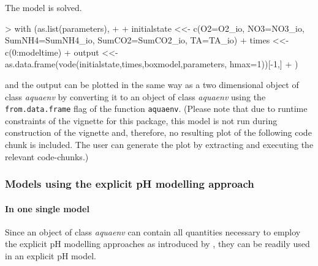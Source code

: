 \documentclass[article,nojss]{jss}
\begin{document}
The model is solved. 

\begin{scriptsize}
\begin{Schunk}
\begin{Sinput}
> with (as.list(parameters),
+       {
+         initialstate <<- c(O2=O2_io, NO3=NO3_io, SumNH4=SumNH4_io, SumCO2=SumCO2_io, TA=TA_io)
+         times        <<- c(0:modeltime)
+         output       <<- as.data.frame(vode(initialstate,times,boxmodel,parameters, hmax=1))[-1,]        
+       })
\end{Sinput}
\end{Schunk}
\end{scriptsize}

and the output can be plotted in the same way as a two dimensional object of class \textit{aquaenv} by converting it 
to an object of class \textit{aquaenv} using the \texttt{from.data.frame} flag of the function \texttt{aquaenv}.
(Please note that due to runtime constraints of the vignette for this package, this model is not run during construction of the vignette 
and, therefore, no resulting plot of the following code chunk is included. The user can generate the plot by extracting and executing the relevant code-chunks.)

\begin{Schunk}
\end{Schunk}




\subsubsection{Models using the explicit pH modelling approach}

\paragraph{In one single model} $\;$\\

Since an object of class \textit{aquaenv} can contain all quantities necessary to employ the explicit pH modelling approaches as introduced by 
\cite{Hofmann2008, Hofmann2009, Hofmann2008c}, they can be readily used in an explicit pH model.\\
\end{document}
